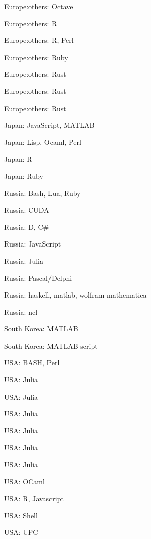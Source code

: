 \item Europe:others: Octave
\item Europe:others: R
\item Europe:others: R, Perl
\item Europe:others: Ruby
\item Europe:others: Rust
\item Europe:others: Rust
\item Europe:others: Rust
\item Japan: JavaScript, MATLAB
\item Japan: Lisp, Ocaml, Perl
\item Japan: R
\item Japan: Ruby
\item Russia: Bash, Lua, Ruby
\item Russia: CUDA
\item Russia: D, C\#
\item Russia: JavaScript
\item Russia: Julia
\item Russia: Pascal/Delphi
\item Russia: haskell, matlab, wolfram mathematica
\item Russia: ncl
\item South Korea: MATLAB
\item South Korea: MATLAB script
\item USA: BASH, Perl
\item USA: Julia
\item USA: Julia
\item USA: Julia
\item USA: Julia
\item USA: Julia
\item USA: Julia
\item USA: OCaml
\item USA: R, Javascript
\item USA: Shell
\item USA: UPC
